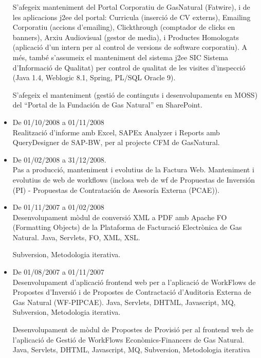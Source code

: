 \documentclass[11pt]{article}
\begin{document}
\begin{itemize}
S’afegeix manteniment del Portal Corporatiu de GasNatural (Fatwire), i de les aplicacions j2ee del portal: Curricula (inserció de CV externs), Emailing Corporatiu (accions d’emailing), Clickthrough (comptador de clicks en banners), Arxiu Audiovisual (gestor de media), i Productes Homologats (aplicació d’un intern per al control de versions de software corporatiu). A més, també s’assumeix el manteniment del sistema j2ee SIC Sistema d’Informació de Qualitat) per control de qualitat de les visites d’inspecció (Java 1.4, Weblogic 8.1, Spring, PL/SQL Oracle 9).

S'afegeix el manteniment (gestió de continguts i desenvolupaments en MOSS) del ``Portal de la Fundación de Gas Natural'' en SharePoint.


\item De 01/10/2008 a 01/11/2008\\
\label{sec-5-1-3-6}%
Realització d’informe amb Excel, SAPEx Analyzer i Reports amb QueryDesigner de SAP-BW, per al projecte CFM de GasNatural.


\item De 01/02/2008 a 31/12/2008.\\
\label{sec-5-1-3-7}%
Pas a producció, manteniment i evolutius de la Factura Web. Manteniment i evolutius de web de workflows (inclosa web de wf de Propuestas de Inversión (PI) - Propuestas de Contratación de Asesoría Externa (PCAE)).


\item De 01/11/2007 a 01/02/2008\\
\label{sec-5-1-3-8}%
Desenvolupament mòdul de conversió XML a PDF amb Apache FO (Formatting Objects) de la Plataforma de Facturació Electrònica de Gas Natural. Java, Servlets, FO, XML, XSL. 

Subversion, Metodologia iterativa.


\item De 01/08/2007 a 01/11/2007\\
\label{sec-5-1-3-9}%
Desenvolupament d’aplicació frontend web per a l’aplicació de WorkFlows de Propostes d’Inversió i de Propostes de Contractació d’Auditoria Externa de Gas Natural (WF-PIPCAE). Java, Servlets, DHTML, Javascript, MQ, Subversion, Metodologia iterativa.

Desenvolupament de mòdul de Propostes de Provisió per al frontend web de l’aplicació de Gestió de WorkFlows Econòmics-Financers de Gas Natural. Java, Servlets, DHTML, Javascript, MQ, Subversion, Metodologia iterativa

\end{itemize} %
\end{document}
